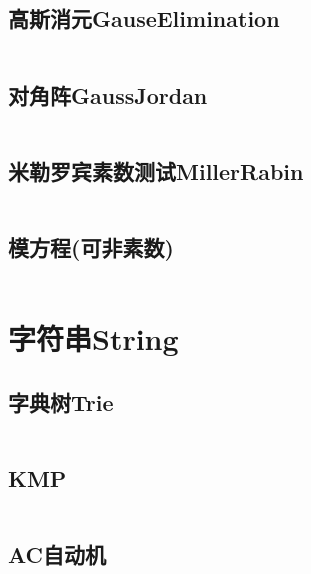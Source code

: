 \documentclass[twoside,sub3section,UTF8]{ctexart}						%
\begin{document}
	\subsection{高斯消元GauseElimination}
		\inputminted{c++}{"Maths/GauseElimination.cpp"}
	\subsection{对角阵GaussJordan}
		\inputminted{c++}{"Maths/GaussJordan.cpp"}
	\subsection{米勒罗宾素数测试MillerRabin}
		\inputminted{c++}{"Maths/MillerRabin.cpp"}
	\subsection{模方程(可非素数)}
		\inputminted{c++}{"Maths/模方程（可非素数）.cpp"}


\section{字符串String}
	\subsection{字典树Trie}
		\inputminted{c++}{"String/Trie.cpp"}
	\subsection{KMP}
		\inputminted{c++}{"String/KMP.cpp"}
	\subsection{AC自动机}
		\inputminted{c++}{"String/AC.cpp"}
\end{document}
